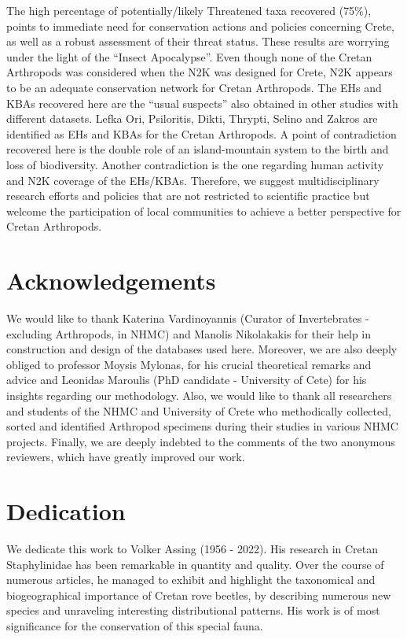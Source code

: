 The high percentage of potentially/likely Threatened taxa recovered (75\%),
points to immediate need for conservation actions and policies concerning Crete,
as well as a robust assessment of their threat status. These results are
worrying under the light of the “Insect Apocalypse”. Even though none of the
Cretan Arthropods was considered when the N2K was designed for Crete, N2K
appears to be an adequate conservation network for Cretan Arthropods. The EHs
and KBAs recovered here are the “usual suspects” also obtained in other studies
with different datasets. Lefka Ori, Psiloritis, Dikti, Thrypti, Selino and
Zakros are identified as EHs and KBAs for the Cretan Arthropods.  A point of
contradiction recovered here is the double role of an island-mountain system to
the birth and loss of biodiversity. Another contradiction is the one regarding
human activity and N2K coverage of the EHs/KBAs. Therefore, we suggest
multidisciplinary research efforts and policies that are not restricted to
scientific practice but welcome the participation of local communities to
achieve a better perspective for Cretan Arthropods.

\section*{Acknowledgements}
We would like to thank Katerina Vardinoyannis (Curator of Invertebrates - excluding Arthropods, in NHMC) and
Manolis Nikolakakis for their help in construction and design of the databases
used here. Moreover, we are also deeply obliged to professor Moysis Mylonas,
for his crucial theoretical remarks and advice and Leonidas Maroulis (PhD candidate - University of Cete)
for his insights regarding our methodology. Also, we would like to thank all
researchers and students of the NHMC and University of Crete who methodically
collected, sorted and identified Arthropod specimens during their studies in
various NHMC projects. Finally, we are deeply indebted to the comments of the
two anonymous reviewers, which have greatly improved our work.

\section*{Dedication}
We dedicate this work to Volker Assing (1956 - 2022). His research in Cretan
Staphylinidae has been remarkable in quantity and quality. Over the course of
numerous articles, he managed to exhibit and highlight the taxonomical and
biogeographical importance of Cretan rove beetles, by describing numerous new
species and unraveling interesting distributional patterns. His work is of most
significance for the conservation of this special fauna.

